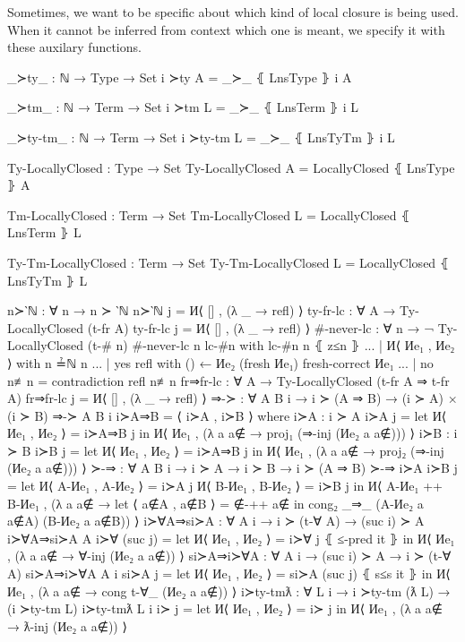 \documentclass[logo,bsc,singlespacing,parskip,online]{infthesis}
\renewenvironment{code}{\mintedcopy[breaklines,breaksymbolleft=\;]{agda}}{\endmintedcopy}
\begin{document}
Sometimes, we want to be specific about which kind of local closure is being used. When it cannot be
inferred from context which one is meant, we specify it with these auxilary functions.

\begin{code}
  _≻ty_ : ℕ → Type → Set
  i ≻ty A = _≻_ ⦃ LnsType ⦄ i A

  _≻tm_ : ℕ → Term → Set
  i ≻tm L = _≻_ ⦃ LnsTerm ⦄ i L

  _≻ty-tm_ : ℕ → Term → Set
  i ≻ty-tm L = _≻_ ⦃ LnsTyTm ⦄ i L

  Ty-LocallyClosed : Type → Set
  Ty-LocallyClosed A = LocallyClosed ⦃ LnsType ⦄ A

  Tm-LocallyClosed : Term → Set
  Tm-LocallyClosed L = LocallyClosed ⦃ LnsTerm ⦄ L

  Ty-Tm-LocallyClosed : Term → Set
  Ty-Tm-LocallyClosed L = LocallyClosed ⦃ LnsTyTm ⦄ L
\end{code}

\begin{code}
  n≻‵ℕ : ∀ {n} → n ≻ ‵ℕ
  n≻‵ℕ j = И⟨ [] , (λ _ → refl) ⟩
  ty-fr-lc : ∀ {A} → Ty-LocallyClosed (t-fr A)
  ty-fr-lc j = И⟨ [] , (λ _ → refl) ⟩
  #-never-lc : ∀ {n} → ¬ Ty-LocallyClosed (t-# n)
  #-never-lc {n} lc-#n with lc-#n n ⦃ z≤n ⦄
  ... | И⟨ Иe₁ , Иe₂ ⟩ with n ≟ℕ n
  ...   | yes refl with () ← Иe₂ (fresh Иe₁) {fresh-correct Иe₁}
  ...   | no  n≢n  = contradiction refl n≢n
  fr⇒fr-lc : ∀ {A} → Ty-LocallyClosed (t-fr A ⇒ t-fr A)
  fr⇒fr-lc j = И⟨ [] , (λ _ → refl) ⟩
  ⇒-≻ : ∀ {A B i} → i ≻ (A ⇒ B) → (i ≻ A) × (i ≻ B)
  ⇒-≻ {A} {B} {i} i≻A⇒B = ⟨ i≻A , i≻B ⟩
    where
      i≻A : i ≻ A
      i≻A j = let И⟨ Иe₁ , Иe₂ ⟩ = i≻A⇒B j
        in И⟨ Иe₁ , (λ a {a∉} → proj₁ (⇒-inj (Иe₂ a {a∉}))) ⟩
      i≻B : i ≻ B
      i≻B j = let И⟨ Иe₁ , Иe₂ ⟩ = i≻A⇒B j
        in И⟨ Иe₁ , (λ a {a∉} → proj₂ (⇒-inj (Иe₂ a {a∉}))) ⟩
  ≻-⇒ : ∀ {A B i} → i ≻ A → i ≻ B → i ≻ (A ⇒ B)
  ≻-⇒ i≻A i≻B j =
    let И⟨ A-Иe₁ , A-Иe₂ ⟩ = i≻A j
        И⟨ B-Иe₁ , B-Иe₂ ⟩ = i≻B j
    in И⟨ A-Иe₁ ++ B-Иe₁ , (λ a {a∉} →
      let ⟨ a∉A , a∉B ⟩ = ∉-++ a∉
      in cong₂ _⇒_ (A-Иe₂ a {a∉A}) (B-Иe₂ a {a∉B})) ⟩
  i≻∀A⇒si≻A : ∀ {A i} → i ≻ (t-∀ A) → (suc i) ≻ A
  i≻∀A⇒si≻A {A} i≻∀ (suc j) =
    let И⟨ Иe₁ , Иe₂ ⟩ = i≻∀ j ⦃ ≤-pred it ⦄
    in И⟨ Иe₁ , (λ a {a∉} → ∀-inj (Иe₂ a {a∉})) ⟩
  si≻A⇒i≻∀A : ∀ {A i} → (suc i) ≻ A → i ≻ (t-∀ A)
  si≻A⇒i≻∀A {A} {i} si≻A j =
    let И⟨ Иe₁ , Иe₂ ⟩ = si≻A (suc j) ⦃ s≤s it ⦄
    in И⟨ Иe₁ , (λ a {a∉} → cong t-∀_ (Иe₂ a {a∉})) ⟩
  i≻ty-tmƛ : ∀ {L i} → i ≻ty-tm (ƛ L) → (i ≻ty-tm L)
  i≻ty-tmƛ {L} {i} i≻ j = let И⟨ Иe₁ , Иe₂ ⟩ = i≻ j
    in И⟨ Иe₁ , (λ a {a∉} → ƛ-inj (Иe₂ a {a∉})) ⟩
\end{code}
\end{document}
